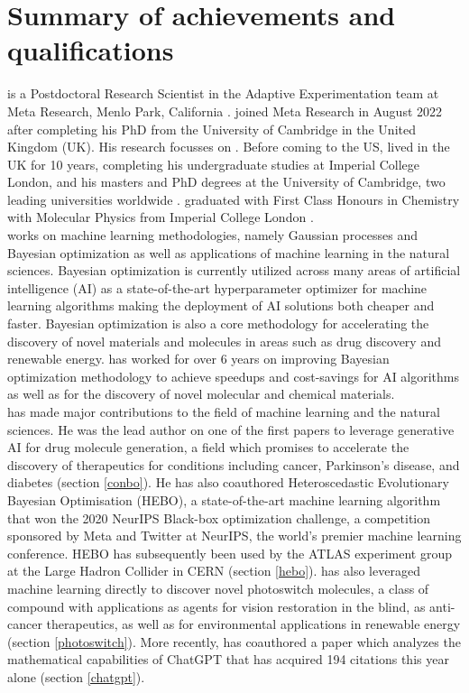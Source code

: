 \documentclass[11pt]{article}
\begin{document}
\newpage
\section{Summary of \drs achievements and qualifications}

\dr is a Postdoctoral Research Scientist in the Adaptive Experimentation team at Meta Research, Menlo Park, California \cite{metaoffer}. \dr joined Meta Research in August 2022 after completing his PhD from the University of Cambridge in the United Kingdom (UK). His research focusses on \fie{}. Before coming to the US, \dr lived in the UK for 10 years, completing his undergraduate studies at Imperial College London, and his masters and PhD degrees at the University of Cambridge, two leading universities worldwide \cite{cv} \cite{degrees}. \dr graduated with First Class Honours in Chemistry with Molecular Physics from Imperial College London \cite{degrees}.\\



\dr works on machine learning methodologies, namely Gaussian processes and Bayesian optimization as well as applications of machine learning in the natural sciences. Bayesian optimization is currently utilized across many areas of artificial intelligence (AI) as a state-of-the-art hyperparameter optimizer for machine learning algorithms making the deployment of AI solutions both cheaper and faster. Bayesian optimization is also a core methodology for accelerating the discovery of novel materials and molecules in areas such as drug discovery and renewable energy. \dr has worked for over 6 years on improving Bayesian optimization methodology to achieve speedups and cost-savings for AI algorithms as well as for the discovery of novel molecular and chemical materials. \\


\dr has made major contributions to the field of machine learning and the natural sciences. He was the lead author on one of the first papers to leverage generative AI for drug molecule generation, a field which promises to accelerate the discovery of therapeutics for conditions including cancer, Parkinson’s disease, and diabetes (section \ref{conbo}). He has also coauthored Heteroscedastic Evolutionary Bayesian Optimisation (HEBO), a state-of-the-art machine learning algorithm that won the 2020 NeurIPS Black-box optimization challenge, a competition sponsored by Meta and Twitter at NeurIPS, the world’s premier machine learning conference. HEBO has subsequently been used by the ATLAS experiment group at the Large Hadron Collider in CERN (section \ref{hebo}). \dr has also leveraged machine learning directly to discover novel photoswitch molecules, a class of compound with applications as agents for vision restoration in the blind, as anti-cancer therapeutics, as well as for environmental applications in renewable energy (section \ref{photoswitch}). More recently, \dr has coauthored a paper which analyzes the mathematical capabilities of ChatGPT that has acquired 194 citations this year alone (section \ref{chatgpt}). \\
\end{document}
